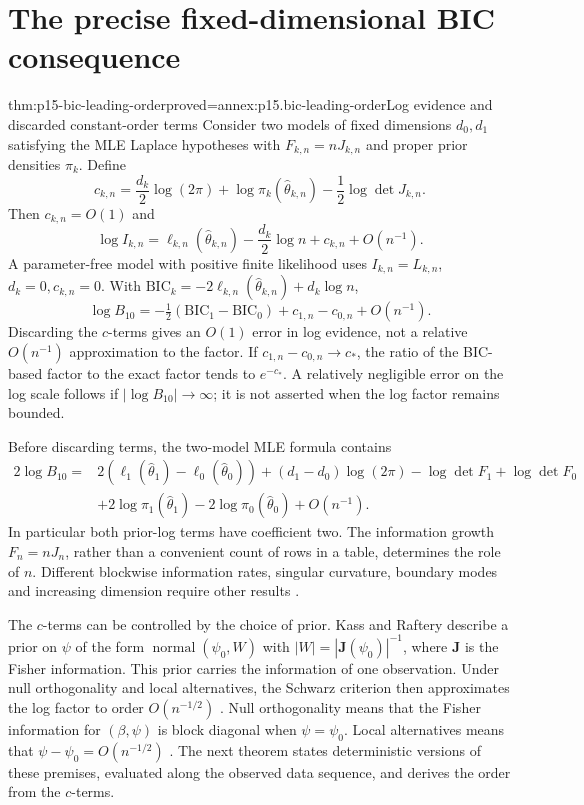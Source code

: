 \section{The precise fixed-dimensional BIC consequence}
\label{sec:p15-bic-consequence}

\begin{hbtheorem}{thm:p15-bic-leading-order}{proved=annex:p15.bic-leading-order}{Log evidence and discarded constant-order terms}
Consider two models of fixed dimensions \(d_0,d_1\) satisfying the MLE
Laplace hypotheses with \(F_{k,n}=nJ_{k,n}\) and proper prior densities
\(\pi_k\). Define
\[
 c_{k,n}=\frac{d_k}{2}\log(2\pi)+\log\pi_k(\widehat\theta_{k,n})
                         -\frac12\log\det J_{k,n}.
\]
Then \(c_{k,n}=O(1)\) and
\[
 \log I_{k,n}
 =\ell_{k,n}(\widehat\theta_{k,n})-\frac{d_k}{2}\log n
                +c_{k,n}+O(n^{-1}).
\]
A parameter-free model with positive finite likelihood uses
\(I_{k,n}=L_{k,n}\), \(d_k=0,c_{k,n}=0\).
With
\(\mathrm{BIC}_k=-2\ell_{k,n}(\widehat\theta_{k,n})+d_k\log n\),
\[
 \log B_{10}
 =-\tfrac12(\mathrm{BIC}_1-\mathrm{BIC}_0)
                     +c_{1,n}-c_{0,n}+O(n^{-1}).
\]
Discarding the \(c\)-terms gives an \(O(1)\) error in log evidence,
not a relative \(O(n^{-1})\) approximation to the factor. If
\(c_{1,n}-c_{0,n}\to c_*\), the ratio of the BIC-based factor to
the exact factor tends to \(e^{-c_*}\). A relatively negligible error on
the log scale follows if \(|\log B_{10}|\to\infty\); it is not asserted
when the log factor remains bounded.
\end{hbtheorem}

Before discarding terms, the two-model MLE formula contains
\[
\begin{split}
2\log B_{10}={}&2(\ell_1(\widehat\theta_1)-\ell_0(\widehat\theta_0))
 +(d_1-d_0)\log(2\pi)-\log\det F_1+\log\det F_0\\
 &+2\log\pi_1(\widehat\theta_1)-2\log\pi_0(\widehat\theta_0)+O(n^{-1}).
\end{split}
\]
In particular both prior-log terms have coefficient two. The information
growth \(F_n=nJ_n\), rather than a convenient count of rows in a table,
determines the role of \(n\). Different blockwise information rates, singular
curvature, boundary modes and increasing dimension require other results
\cite[Sec.~4.1.3]{KassRaftery1995BayesFactors}.

The \(c\)-terms can be controlled by the choice of prior. Kass and
Raftery describe a prior on \(\psi\) of the form
\(\operatorname{normal}(\psi_0,W)\) with \(|W|=|\mathbf J(\psi_0)|^{-1}\),
where \(\mathbf J\) is the Fisher information. This prior carries the
information of one observation. Under null orthogonality and local
alternatives, the Schwarz criterion then approximates the log factor to
order \(O(n^{-1/2})\) \cite[Sec.~4.1.3, p.~779]{KassRaftery1995BayesFactors}.
Null orthogonality means that the Fisher information for
\((\beta,\psi)\) is block diagonal when \(\psi=\psi_0\). Local
alternatives means that \(\psi-\psi_0=O(n^{-1/2})\)
\cite[Sec.~5.2, p.~782]{KassRaftery1995BayesFactors}. The next theorem
states deterministic versions of these premises, evaluated along the
observed data sequence, and derives the order from the \(c\)-terms.

